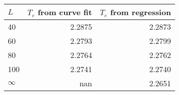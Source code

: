 \begin{tabular}{lrr}
\toprule
$L$ & $T_c$ from curve fit & $T_c$ from regression \\
\midrule
40 & 2.2875 & 2.2873 \\
60 & 2.2793 & 2.2799 \\
80 & 2.2764 & 2.2762 \\
100 & 2.2741 & 2.2740 \\
$\infty$ & nan & 2.2651 \\
\bottomrule
\end{tabular}
